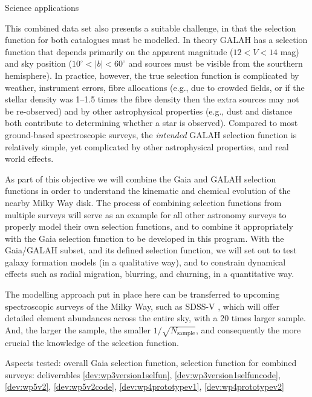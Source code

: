 \begin{workpackage}{Science applications}
\begin{wpobjectives}
\begin{description}
{        This combined data set also presents a suitable challenge, in that the selection function for both catalogues must be modelled. In theory GALAH has a selection function that depends primarily on the apparent magnitude ($12 < V <14$ mag) and sky position ($10^\circ < |b| < 60^\circ$ and sources must be visible from the sourthern hemisphere). In practice, however, the true selection function is complicated by weather, instrument errors, fibre allocations (e.g., due to crowded fields, or if the stellar density was 1--1.5 times the fibre density then the extra sources may not be re-observed) and by other astrophysical properties (e.g., dust and distance both contribute to determining whether a star is observed). Compared to most ground-based spectroscopic surveys, the \emph{intended} GALAH selection function is relatively simple, yet complicated by other astrophysical properties, and real world effects.
      
        As part of this objective we will combine the Gaia and GALAH selection functions in order to understand the kinematic and chemical evolution of the nearby Milky Way disk. The process of combining selection functions from multiple surveys will serve as an example for all other astronomy surveys to properly model their own selection functions, and to combine it appropriately with the Gaia selection function to be developed in this program. With the Gaia/GALAH subset, and its defined selection function, we will set out to test galaxy formation models (in a qualitative way), and to constrain dynamical effects such as radial migration, blurring, and churning, in a quantitative way. 
        
        The modelling approach put in place here can be transferred to upcoming spectroscopic surveys of the Milky Way, such as SDSS-V \citep{SDSS-V}, which will offer detailed element abundances across the entire sky, with a 20 times larger sample. And, the larger the sample, the smaller $1/\sqrt{N_\mathrm{sample}}$, and consequently the more crucial the knowledge of the selection function. 
        
        \textsf{Aspects tested: overall Gaia selection function, selection function for combined surveys: deliverables \ref{dev:wp3version1selfun}, \ref{dev:wp3version1selfuncode}, \ref{dev:wp5v2}, \ref{dev:wp5v2code}, \ref{dev:wp4prototypev1}, \ref{dev:wp4prototypev2}}
     }
     
    \end{description}
  \end{wpobjectives}


\end{workpackage}
